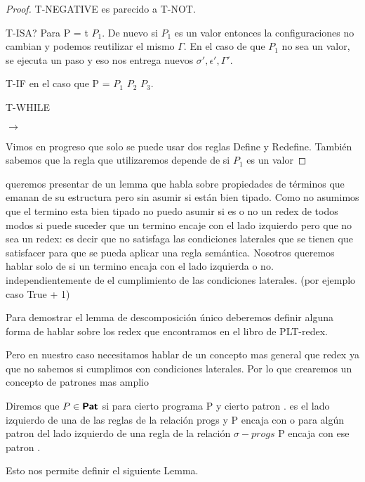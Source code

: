 \begin{proof}
T-NEGATIVE es parecido a T-NOT.

T-ISA? Para P =  t $P_{1}$. De nuevo si $P_{1}$ es un valor entonces la configuraciones no cambian y podemos reutilizar el mismo $\Gamma$.
En el caso de que $P_{1}$ no sea un valor, se ejecuta un paso y eso nos entrega nuevos $\sigma', \epsilon', \Gamma'$.

T-IF en el caso que P =  $P_{1}$  $P_{2}$  $P_{3}$. 

T-WHILE

  $\rightarrow$ 

 Vimos en progreso que solo se puede usar dos reglas Define y Redefine.
También sabemos que la regla que utilizaremos depende de si $P_{1}$ es un valor   
\end{proof}

queremos presentar de un lemma que habla sobre propiedades de términos que emanan de su estructura pero sin asumir si están bien tipado.
Como no asumimos que el termino esta bien tipado no puedo asumir si es o no un redex
de todos modos si puede suceder que un termino encaje con el lado izquierdo pero  que no sea un redex:
 es decir que no satisfaga las condiciones laterales que se tienen que satisfacer para que se pueda aplicar una regla semántica.
Nosotros queremos hablar solo de si un termino encaja con el lado izquierda o no. independientemente de el cumplimiento de las condiciones laterales.
(por ejemplo caso True + 1)

Para demostrar el lemma de descomposición único deberemos definir alguna forma de hablar sobre los redex que encontramos en el libro de PLT-redex.

Pero en nuestro caso necesitamos hablar de un concepto mas general que redex ya que no sabemos si cumplimos con condiciones laterales.
Por lo que crearemos un concepto de patrones mas amplio

\begin{definition}
    Diremos que $P \in \textsf{\textbf{Pat}}$ si para cierto programa P y cierto patron .  es el lado izquierdo de una de las reglas de la relación progs y P encaja con 
    o para algún patron  del lado izquierdo de una regla de la relación $\sigma-progs$ P encaja con ese patron .
\end{definition}

Esto nos permite definir el siguiente Lemma.

